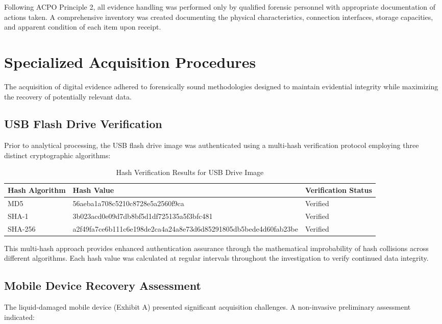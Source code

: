Following ACPO Principle 2, all evidence handling was performed only by qualified forensic personnel with appropriate documentation of actions taken. A comprehensive inventory was created documenting the physical characteristics, connection interfaces, storage capacities, and apparent condition of each item upon receipt.

\section{Specialized Acquisition Procedures}
The acquisition of digital evidence adhered to forensically sound methodologies designed to maintain evidential integrity while maximizing the recovery of potentially relevant data.

\subsection{USB Flash Drive Verification}
Prior to analytical processing, the USB flash drive image was authenticated using a multi-hash verification protocol employing three distinct cryptographic algorithms:

\begin{table}[h]
\centering
\small
\begin{tabular}{|p{3cm}|p{8cm}|p{3cm}|}
\hline
\textbf{Hash Algorithm} & \textbf{Hash Value} & \textbf{Verification Status} \\
\hline
MD5 & 56aeba1a708c5210c8728e5a2560f9ca  & Verified \\
\hline
SHA-1 & 3b023acd0e09d7db8bf5d1df725135a5f3bfc481 & Verified \\
\hline
SHA-256 & \tiny{a2f49fa7ce6b111c6e198de2ca4a24a8e73d6d85291805db5bede4d60fab23be}  & Verified \\
\hline
\end{tabular}
\caption{Hash Verification Results for USB Drive Image}
\label{tab:hash_verification_acq}
\end{table}

This multi-hash approach provides enhanced authentication assurance through the mathematical improbability of hash collisions across different algorithms. Each hash value was calculated at regular intervals throughout the investigation to verify continued data integrity.

\subsection{Mobile Device Recovery Assessment}
The liquid-damaged mobile device (Exhibit A) presented significant acquisition challenges. A non-invasive preliminary assessment indicated:


